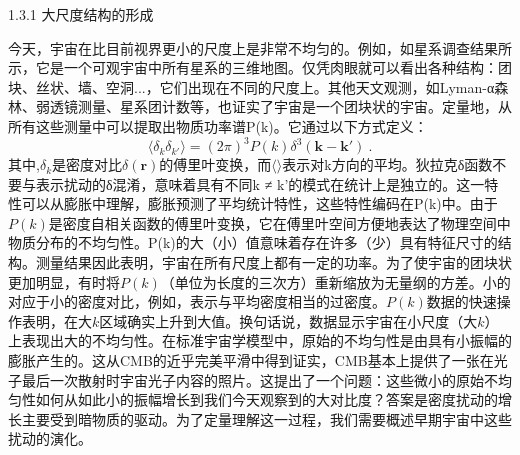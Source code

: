 

1.3.1 大尺度结构的形成

今天，宇宙在比目前视界更小的尺度上是非常不均匀的。例如，如星系调查结果所示，它是一个可观宇宙中所有星系的三维地图。仅凭肉眼就可以看出各种结构：团块、丝状、墙、空洞...，它们出现在不同的尺度上。其他天文观测，如Lyman-α森林、弱透镜测量、星系团计数等，也证实了宇宙是一个团块状的宇宙。定量地，从所有这些测量中可以提取出物质功率谱P(k)。它通过以下方式定义：
\begin{equation}
\langle \delta_k \delta_{k'} \rangle = (2\pi)^3 P(k) \delta^3(\mathbf k - \mathbf k')~.
\end{equation}
其中,$\delta_k$是密度对比$\delta(\mathbf r)$的傅里叶变换，而$\langle\rangle$表示对k方向的平均。狄拉克δ函数不要与表示扰动的δ混淆，意味着具有不同k ≠ k'的模式在统计上是独立的。这一特性可以从膨胀中理解，膨胀预测了平均统计特性，这些特性编码在P(k)中。由于$P(k)$是密度自相关函数的傅里叶变换，它在傅里叶空间方便地表达了物理空间中物质分布的不均匀性。P(k)的大（小）值意味着存在许多（少）具有特征尺寸的结构。测量结果因此表明，宇宙在所有尺度上都有一定的功率。为了使宇宙的团块状更加明显，有时将$P(k)$（单位为长度的三次方）重新缩放为无量纲的方差。小的对应于小的密度对比，例如，表示与平均密度相当的过密度。$P(k)$数据的快速操作表明，在大$k$区域确实上升到大值。换句话说，数据显示宇宙在小尺度（大$k$）上表现出大的不均匀性。在标准宇宙学模型中，原始的不均匀性是由具有小振幅的膨胀产生的。这从CMB的近乎完美平滑中得到证实，CMB基本上提供了一张在光子最后一次散射时宇宙光子内容的照片。这提出了一个问题：这些微小的原始不均匀性如何从如此小的振幅增长到我们今天观察到的大对比度？答案是密度扰动的增长主要受到暗物质的驱动。为了定量理解这一过程，我们需要概述早期宇宙中这些扰动的演化。

